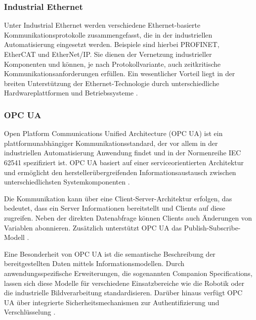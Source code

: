 \subsubsection{Industrial Ethernet}


Unter Industrial Ethernet werden verschiedene Ethernet-basierte Kommunikationsprotokolle zusammengefasst, die in der industriellen Automatisierung eingesetzt werden. Beispiele sind hierbei PROFINET, EtherCAT und EtherNet/IP. Sie dienen der Vernetzung industrieller Komponenten und können, je nach Protokollvariante, auch zeitkritische Kommunikationsanforderungen erfüllen. Ein wesentlicher Vorteil liegt in der breiten Unterstützung der Ethernet-Technologie durch unterschiedliche Hardwareplattformen und Betriebssysteme \cite{Halenar2023,Profanter2019}.

\subsubsection{OPC UA}

Open Platform Communications Unified Architecture (OPC UA) ist ein plattformunabhängiger Kommunikationsstandard, der vor allem in der industriellen Automatisierung Anwendung findet und in der Normenreihe IEC 62541 spezifiziert ist. OPC UA basiert auf einer serviceorientierten Architektur und ermöglicht den herstellerübergreifenden Informationsaustausch zwischen unterschiedlichsten Systemkomponenten \cite{Gonzalez2019}.

Die Kommunikation kann über eine Client-Server-Architektur erfolgen, das bedeutet, dass ein Server Informationen bereitstellt und Clients auf diese zugreifen. Neben der direkten Datenabfrage können Clients auch Änderungen von Variablen abonnieren. Zusätzlich unterstützt OPC UA das Publish-Subscribe-Modell \cite{Profanter2019,Hlayel2026}.


Eine Besonderheit von OPC UA ist die semantische Beschreibung der bereitgestellten Daten mittels Informationsmodellen. Durch anwendungsspezifische Erweiterungen, die sogenannten Companion Specifications, lassen sich diese Modelle für verschiedene Einsatzbereiche wie die Robotik oder die industrielle Bildverarbeitung standardisieren. Darüber hinaus verfügt OPC UA über integrierte Sicherheitsmechanismen zur Authentifizierung und Verschlüsselung \cite{Gonzalez2019,Profanter2019}.

